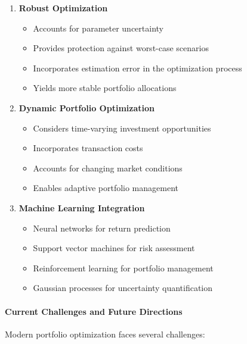 \begin{enumerate}
    \item \textbf{Robust Optimization}
    \begin{itemize}
        \item Accounts for parameter uncertainty
        \item Provides protection against worst-case scenarios
        \item Incorporates estimation error in the optimization process
        \item Yields more stable portfolio allocations
    \end{itemize}

    \item \textbf{Dynamic Portfolio Optimization}
    \begin{itemize}
        \item Considers time-varying investment opportunities
        \item Incorporates transaction costs
        \item Accounts for changing market conditions
        \item Enables adaptive portfolio management
    \end{itemize}

    \item \textbf{Machine Learning Integration}
    \begin{itemize}
        \item Neural networks for return prediction \parencite{heaton2017deep}
        \item Support vector machines for risk assessment
        \item Reinforcement learning for portfolio management
        \item Gaussian processes for uncertainty quantification
    \end{itemize}
\end{enumerate}

\paragraph{Current Challenges and Future Directions}
Modern portfolio optimization faces several challenges:

